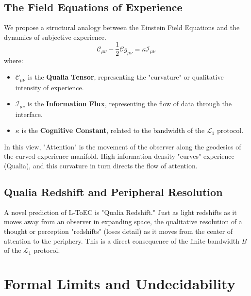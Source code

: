 \documentclass[11pt,onecolumn]{article}
\newcommand{\protocol}{\mathcal{L}_1}
\newcommand{\flux}{\mathcal{I}}
\newcommand{\curvature}{\mathcal{C}}
\begin{document}
\subsection{The Field Equations of Experience}
We propose a structural analogy between the Einstein Field Equations and the dynamics of subjective experience.
\begin{equation}
\curvature_{\mu\nu} - \frac{1}{2}\curvature g_{\mu\nu} = \kappa \flux_{\mu\nu}
\end{equation}
where:
\begin{itemize}
    \item $\curvature_{\mu\nu}$ is the \textbf{Qualia Tensor}, representing the "curvature" or qualitative intensity of experience.
    \item $\flux_{\mu\nu}$ is the \textbf{Information Flux}, representing the flow of data through the interface.
    \item $\kappa$ is the \textbf{Cognitive Constant}, related to the bandwidth of the $\protocol$ protocol.
\end{itemize}
In this view, "Attention" is the movement of the observer along the geodesics of the curved experience manifold. High information density "curves" experience (Qualia), and this curvature in turn directs the flow of attention.

\subsection{Qualia Redshift and Peripheral Resolution}
A novel prediction of L-ToEC is "Qualia Redshift." Just as light redshifts as it moves away from an observer in expanding space, the qualitative resolution of a thought or perception "redshifts" (loses detail) as it moves from the center of attention to the periphery. This is a direct consequence of the finite bandwidth $B$ of the $\protocol$ protocol.

\section{Formal Limits and Undecidability}
\end{document}
